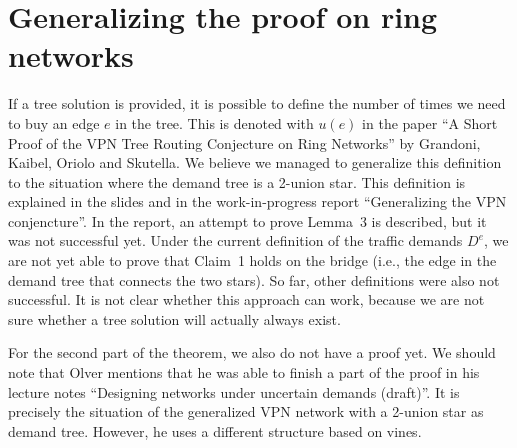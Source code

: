 \documentclass[11pt]{article}
\begin{document}
    \section{Generalizing the proof on ring networks}
    If a tree solution is provided, it is possible to define the number of times we need to buy an edge $e$ in the tree.
    This is denoted with $u(e)$ in the paper ``A Short Proof of the VPN Tree Routing Conjecture on Ring Networks'' by Grandoni, Kaibel, Oriolo and Skutella.
    We believe we managed to generalize this definition to the situation where the demand tree is a 2-union star.
    This definition is explained in the slides and in the work-in-progress report ``Generalizing the VPN conjencture''.
    In the report, an attempt to prove Lemma~3 is described, but it was not successful yet.
    Under the current definition of the traffic demands $D^e$, we are not yet able to prove that Claim~1 holds on the bridge (i.e., the edge in the demand tree that connects the two stars).
    So far, other definitions were also not successful.
    It is not clear whether this approach can work, because we are not sure whether a tree solution will actually always exist.

    For the second part of the theorem, we also do not have a proof yet.
    We should note that Olver mentions that he was able to finish a part of the proof in his lecture notes ``Designing networks under uncertain demands (draft)''.
    It is precisely the situation of the generalized VPN network with a 2-union star as demand tree.
    However, he uses a different structure based on vines.
\end{document}
